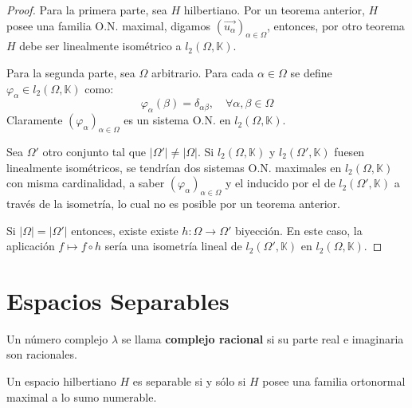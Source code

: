 \documentclass[12pt]{report}
\newcounter{it}
\theoremstyle{largebreak}
\newcommand\cf[3]{\ensuremath{#1:#2\rightarrow#3}}
\newcommand\abs[1]{\ensuremath{\big|#1\big|}}
\begin{document}
    \begin{proof}
        Para la primera parte, sea $H$ hilbertiano. Por un teorema anterior, $H$ posee una familia O.N. maximal, digamos $\left(\vec{u_\alpha} \right)_{\alpha\in\Omega}$, entonces, por otro teorema $H$ debe ser linealmente isométrico a $l_2(\Omega,\mathbb{K})$.

        Para la segunda parte, sea $\Omega$ arbitrario. Para cada $\alpha\in\Omega$ se define $\varphi_\alpha\in l_2(\Omega,\mathbb{K})$ como:
        \begin{equation*}
            \varphi_{\alpha}(\beta)=\delta_{\alpha\beta},\quad\forall\alpha,\beta\in\Omega
        \end{equation*}
        Claramente $\left(\varphi_\alpha \right)_{\alpha\in\Omega}$ es un sistema O.N. en $l_2(\Omega,\mathbb{K})$.

        Sea $\Omega'$ otro conjunto tal que $\abs{\Omega'}\neq\abs{\Omega}$. Si $l_2(\Omega,\mathbb{K})$ y $l_2(\Omega',\mathbb{K})$ fuesen linealmente isométricos, se tendrían dos sistemas O.N. maximales en $l_2(\Omega,\mathbb{K})$ con misma cardinalidad, a saber $\left(\varphi_\alpha \right)_{\alpha\in\Omega}$ y el inducido por el de $l_2(\Omega',\mathbb{K})$ a través de la isometría, lo cual no es posible por un teorema anterior.

        Si $\abs{\Omega}=\abs{\Omega'}$ entonces, existe existe $\cf{h}{\Omega}{\Omega'}$ biyección. En este caso, la aplicación $f\mapsto f\circ h$ sería una isometría lineal de $l_2(\Omega',\mathbb{K})$ en $l_2(\Omega,\mathbb{K})$.
    \end{proof}

    \section{Espacios Separables}

    \begin{mydef}
        Un número complejo $\lambda$ se llama \textbf{complejo racional} si su parte real e imaginaria son racionales.
    \end{mydef}

    \begin{theor}
        Un espacio hilbertiano $H$ es separable si y sólo si $H$ posee una familia ortonormal maximal a lo sumo numerable.
    \end{theor}
\end{document}

